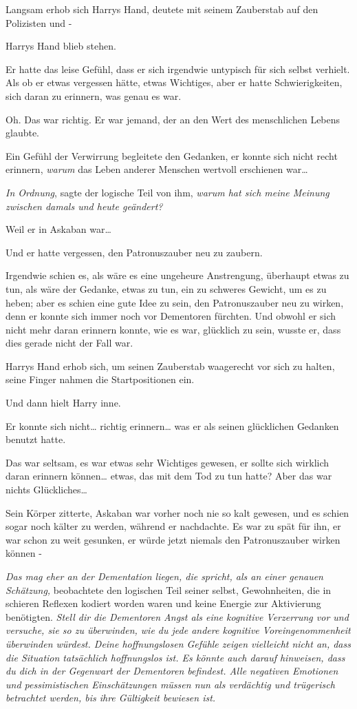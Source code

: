{Langsam erhob sich Harrys Hand, deutete mit seinem Zauberstab auf den Polizisten und -

Harrys Hand blieb stehen.

Er hatte das leise Gefühl, dass er sich irgendwie untypisch für sich selbst verhielt. Als ob er etwas vergessen hätte, etwas Wichtiges, aber er hatte Schwierigkeiten, sich daran zu erinnern, was genau es war.

Oh. Das war richtig. Er war jemand, der an den Wert des menschlichen Lebens glaubte.

Ein Gefühl der Verwirrung begleitete den Gedanken, er konnte sich nicht recht erinnern, \emph{warum} das Leben anderer Menschen wertvoll erschienen war…

\emph{In Ordnung}, sagte der logische Teil von ihm, \emph{warum hat sich meine Meinung zwischen damals und heute geändert?}

Weil er in Askaban war…

Und er hatte vergessen, den Patronuszauber neu zu zaubern.

Irgendwie schien es, als wäre es eine ungeheure Anstrengung, überhaupt etwas zu tun, als wäre der Gedanke, etwas zu tun, ein zu schweres Gewicht, um es zu heben; aber es schien eine gute Idee zu sein, den Patronuszauber neu zu wirken, denn er konnte sich immer noch vor Dementoren fürchten. Und obwohl er sich nicht mehr daran erinnern konnte, wie es war, glücklich zu sein, wusste er, dass dies gerade nicht der Fall war.

Harrys Hand erhob sich, um seinen Zauberstab waagerecht vor sich zu halten, seine Finger nahmen die Startpositionen ein.

Und dann hielt Harry inne.

Er konnte sich nicht… richtig erinnern… was er als seinen glücklichen Gedanken benutzt hatte.

Das war seltsam, es war etwas sehr Wichtiges gewesen, er sollte sich wirklich daran erinnern können… etwas, das mit dem Tod zu tun hatte? Aber das war nichts Glückliches…

Sein Körper zitterte, Askaban war vorher noch nie so kalt gewesen, und es schien sogar noch kälter zu werden, während er nachdachte. Es war zu spät für ihn, er war schon zu weit gesunken, er würde jetzt niemals den Patronuszauber wirken können -

\emph{Das mag eher an der Dementation liegen, die spricht, als an einer genauen Schätzung,} beobachtete den logischen Teil seiner selbst, Gewohnheiten, die in schieren Reflexen kodiert worden waren und keine Energie zur Aktivierung benötigten. \emph{Stell dir die Dementoren Angst als eine kognitive Verzerrung vor und versuche, sie so zu überwinden, wie du jede andere kognitive Voreingenommenheit überwinden würdest. Deine hoffnungslosen Gefühle zeigen vielleicht nicht an, dass die Situation tatsächlich hoffnungslos ist. Es könnte auch darauf hinweisen, dass du dich in der Gegenwart der Dementoren befindest. Alle negativen Emotionen und pessimistischen Einschätzungen müssen nun als verdächtig und trügerisch betrachtet werden, bis ihre Gültigkeit bewiesen ist.}

}
